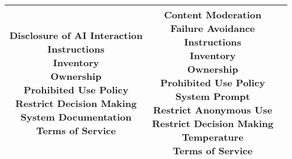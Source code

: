 \documentclass[fleqn]{article}
\begin{document}
\begin{landscape}
\begin{table}[H]
\begin{tabular}{|c|c|c|}
{			\textbullet\hspace{3pt} Disclosure of AI Interaction\\ 		
			\textbullet\hspace{3pt} Instructions\\ 	
			\textbullet\hspace{3pt} Inventory\\ 	
			\textbullet\hspace{3pt} Ownership\\ 	
			\textbullet\hspace{3pt} Prohibited Use Policy\\ 
			\textbullet\hspace{3pt} Restrict Decision Making \\					
			\textbullet\hspace{3pt} System Documentation\\ 	
			\textbullet\hspace{3pt} Terms of Service\\ 	 	
		}
		& 
		\makecell[l]{	
			\textbullet\hspace{3pt} Content Moderation\\
			\textbullet\hspace{3pt} Failure Avoidance\\ 	
			\textbullet\hspace{3pt} Instructions\\ 	
			\textbullet\hspace{3pt} Inventory\\ 	
			\textbullet\hspace{3pt} Ownership\\ 
			\textbullet\hspace{3pt} Prohibited Use Policy\\ 	
			\textbullet\hspace{3pt} System Prompt\\ 
			\textbullet\hspace{3pt} Restrict Anonymous Use\\ 			
			\textbullet\hspace{3pt} Restrict Decision Making\\  				
			\textbullet\hspace{3pt} Temperature\\ 	
			\textbullet\hspace{3pt} Terms of Service\\ 	
		} 
		\\
		\hline
	\end{tabular}
	\label{table:low_risk_plan_by_tc1}
\end{table}


\end{landscape}
\end{document}
